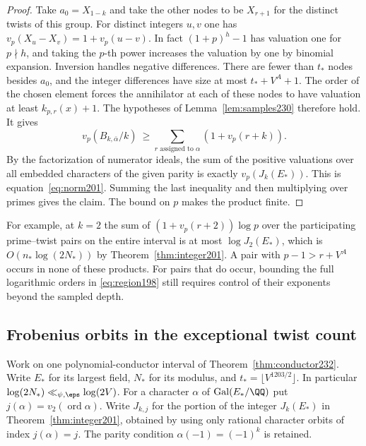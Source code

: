 \documentclass[a4paper,11pt]{article}
\theoremstyle{definition}
\theoremstyle{remark}
\numberwithin{equation}{section}
\begin{document}
\begin{proof}
Take \(a_0=X_{1-k}\) and take the other nodes to be \(X_{r+1}\)
for the distinct twists of this group. For distinct integers
\(u,v\) one has \(v_p(X_u-X_v)=1+v_p(u-v)\). In fact
\((1+p)^h-1\) has valuation one for \(p\nmid h\), and taking
the \(p\)-th power increases the valuation by one by binomial
expansion. Inversion handles negative differences. There are
fewer than \(t_*\) nodes besides \(a_0\), and the integer
differences have size at most \(t_*+V^A+1\).
The order of the chosen element forces the annihilator at
each of these nodes to have valuation at least
\(k_{p,r}(x)+1\). The hypotheses of
Lemma~\ref{lem:samples230} therefore hold. It gives
\[
 v_p(B_{k,\bar\alpha}/k)\ \ge       \sum_{r\text{ assigned to }\alpha}(1+v_p(r+k)).
\]
By the factorization of numerator ideals, the sum of the
positive valuations over all embedded characters of the given
parity is exactly \(v_p(J_k(E_*))\). This is equation~\eqref{eq:norm201}. Summing the last inequality and then multiplying
over primes gives the claim. The bound on \(p\) makes the
product finite.
\end{proof}

For example, at \(k=2\) the sum of
\((1+v_p(r+2))\log p\) over the participating prime--twist
pairs on the entire interval is at most \(\log J_2(E_*)\),
which is \(O(n_*\log(2N_*))\) by Theorem~\ref{thm:integer201}.
A pair with \(p-1>r+V^A\) occurs in none of these products.
For pairs that do occur, bounding the full logarithmic orders
in \eqref{eq:region198} still requires control of their
exponents beyond the sampled depth.

\subsection{Frobenius orbits in the exceptional twist count}\label{nav:II-41}
Work on one polynomial-conductor interval of Theorem~\ref{thm:conductor232}.
Write \(E_*\) for its largest field, \(N_*\) for its modulus, and
\(t_*=\lfloor V^{1203/2}\rfloor\). In particular \(\log(2N_*)\ll_{\psi,\eps}
\log(2V)\). For a character \(\alpha\) of \(\operatorname{Gal}(E_*/\QQ)\)
put \(j(\alpha)=v_2(\operatorname{ord}\alpha)\). Write \(J_{k,j}\) for
the portion of the integer \(J_k(E_*)\) in Theorem~\ref{thm:integer201}, obtained by using only rational character
orbits of index \(j(\alpha)=j\). The parity condition
\(\alpha(-1)=(-1)^k\) is retained.
\end{document}
